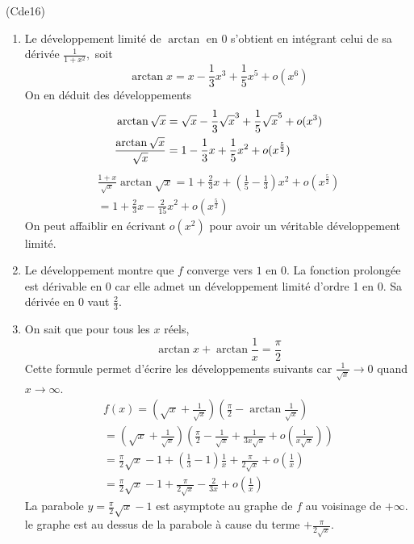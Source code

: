 \begin{tiny}(Cde16)\end{tiny} 
\begin{enumerate}
\item  Le d\'{e}veloppement limit\'{e} de $\arctan $ en 0 s'obtient en int\'{e}grant celui de sa d\'{e}riv\'{e}e $\frac{1}{1+x^{2}},$ soit
\begin{displaymath}
\arctan x=x-\frac{1}{3}x^{3}+\frac{1}{5}x^{5}+o(x^{6}) 
\end{displaymath}
On en d\'{e}duit des d\'{e}veloppements 
\begin{align*}
\arctan \sqrt{x} &= \sqrt{x}-\frac{1}{3}\sqrt{x}^{3}+\frac{1}{5}\sqrt{x}%
^{5}+o(x^{3}) \\
\frac{\arctan \sqrt{x}}{\sqrt{x}} &= 1-\frac{1}{3}x+\frac{1}{5}x^{2}+o(x^{%
\frac{5}{2}})
\end{align*}
\begin{multline*}
 \frac{1+x}{\sqrt{x}}\arctan \sqrt{x} 
= 1+\frac{2}{3}x+(\frac{1}{5}-\frac{1}{3})x^{2}+o(x^{\frac{5}{2}}) \\
= 1+\frac{2}{3}x-\frac{2}{15}x^{2}+o(x^{\frac{5}{2}})
\end{multline*}
On peut affaiblir en écrivant $o(x^2)$ pour avoir un véritable développement limité.
\item  Le d\'{e}veloppement montre que $f$ converge vers $1$ en $0$. La fonction prolong\'{e}e est d\'{e}rivable en $0$ car elle admet un d\'{e}veloppement limit\'{e} d'ordre 1 en $0$. Sa d\'{e}riv\'{e}e en $0$ vaut $\frac{2}{3}$.

\item  On sait que pour tous les $x$ r\'{e}els, 
\[
\arctan x+\arctan \frac{1}{x}=\frac{\pi }{2}
\]
Cette formule permet d'\'{e}crire les d\'{e}veloppements suivants car $\frac{1}{\sqrt{x}}\rightarrow 0$ quand $x\rightarrow \infty $.
\begin{multline*}
f(x) =(\sqrt{x}+\frac{1}{\sqrt{x}})(\frac{\pi }{2}-\arctan \frac{1}{\sqrt{x}}) \\
 = (\sqrt{x}+\frac{1}{\sqrt{x}})(\frac{\pi }{2}-\frac{1}{\sqrt{x}}+\frac{1}{3x\sqrt{x}}+o(\frac{1}{x\sqrt{x}})) \\
 = \frac{\pi }{2}\sqrt{x}-1+(\frac{1}{3}-1)\frac{1}{x}+\frac{\pi }{2\sqrt{x}}+o(\frac{1}{x}) \\
 = \frac{\pi }{2}\sqrt{x}-1+\frac{\pi }{2\sqrt{x}}-\frac{2}{3x}+o(\frac{1}{x})
\end{multline*}
La parabole $y=\frac{\pi }{2}\sqrt{x}-1$ est asymptote au graphe de $f$ au voisinage de $+\infty $. le graphe est au dessus de la parabole \`{a} cause du terme $+\frac{\pi }{2\sqrt{x}}$.
\end{enumerate}

